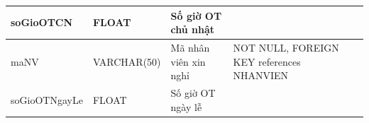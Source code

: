 \documentclass[a4paper,12pt]{report}
\begin{document}
\begin{center}
\begin{longtable}{|>{\centering\arraybackslash}p{4.5cm}|
        >{\centering\arraybackslash}p{3.5cm}|
        >{\centering\arraybackslash}p{3.5cm}|
        >{\centering\arraybackslash}p{4cm}|}
        \hline
        soGioOTCN &  FLOAT  & Số giờ OT chủ nhật & \\                                                                                                                          
        \hline
        maNV &  VARCHAR(50)  & Mã nhân viên xin nghỉ & NOT NULL, FOREIGN KEY references NHANVIEN \\                                                                                                                          
        \hline
        soGioOTNgayLe &  FLOAT  & Số giờ OT ngày lễ & \\                                                                                                                          
        \hline
    \end{longtable}
\end{center}
\end{document}
